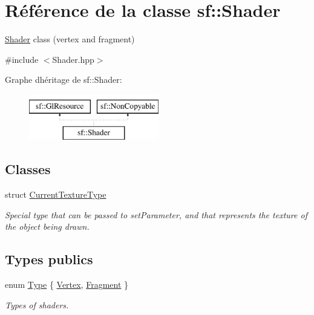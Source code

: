 \hypertarget{classsf_1_1Shader}{}\section{Référence de la classe sf\+:\+:Shader}
\label{classsf_1_1Shader}


\hyperlink{classsf_1_1Shader}{Shader} class (vertex and fragment)  




{\ttfamily \#include $<$Shader.\+hpp$>$}

Graphe d\textquotesingle{}héritage de sf\+:\+:Shader\+:\begin{figure}[H]
\begin{center}
\leavevmode
\includegraphics[height=2.000000cm]{classsf_1_1Shader}
\end{center}
\end{figure}
\subsection*{Classes}
\begin{DoxyCompactItemize}
\item 
struct \hyperlink{structsf_1_1Shader_1_1CurrentTextureType}{Current\+Texture\+Type}
\begin{DoxyCompactList}\small\item\em Special type that can be passed to set\+Parameter, and that represents the texture of the object being drawn. \end{DoxyCompactList}\end{DoxyCompactItemize}
\subsection*{Types publics}
\begin{DoxyCompactItemize}
\item 
enum \hyperlink{classsf_1_1Shader_afaa1aa65e5de37b74d047da9def9f9b3}{Type} \{ \hyperlink{classsf_1_1Shader_afaa1aa65e5de37b74d047da9def9f9b3a8718008f827eb32e29bbdd1791c62dce}{Vertex}, 
\hyperlink{classsf_1_1Shader_afaa1aa65e5de37b74d047da9def9f9b3ace6e88eec3a56b2e55ee3c8e64e9b89a}{Fragment}
 \}\begin{DoxyCompactList}\small\item\em Types of shaders. \end{DoxyCompactList}
\end{DoxyCompactItemize}
